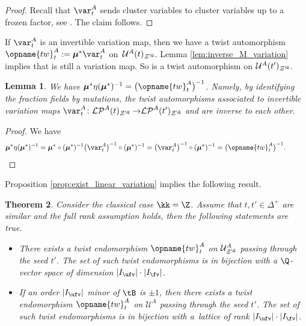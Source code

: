 \documentclass[pdftex]{sigma}
\renewcommand{\tw}{\opname{tw}}
\newcommand{\Iufv}{I_{\ufv}}
\newcommand{\Ifv}{I_{\fv}}
\newcommand{\upClAlg}{\mathcal{U}^A}
\newcommand{\LP}{{\mathcal{LP}}}
\newcommand{\fFac}{\mathcal{Z}}
\newcommand{\fFacRoot}{\fFac^{\Q}}
\newcommand{\seq}{\boldsymbol{\mu}}%
\renewcommand{\tw}{\opname{tw}}
\numberwithin{equation}{section}
\newtheorem{Theorem}{Theorem}[section]
\newtheorem{Lemma}[Theorem]{Lemma}
\begin{document}
\begin{proof}
Recall that $\var_{t}^{A}$ sends cluster variables to cluster
variables up to a frozen factor, see \cite[Lemma 4.2.2]{qin2017triangular}.
The claim follows.
\end{proof}

If $\var_{t}^{A}$ is an invertible variation map, then we have a
twist automorphism $\tw_{t}^{A}:=\seq^{*}\var_{t}^{A}$ on~$\upClAlg(t)_{\fFacRoot}$.
Lemma \ref{lem:inverse_M_variation} implies that 
is still a variation map. So \smash{$\eta:=(\seq^{*})^{-1}\bigl(\var_{t}^{A}\bigr)^{-1}$}
is a twist automorphism on $\upClAlg(t')_{\fFacRoot}$.

\begin{Lemma}\label{lem:inverse_A_twist_automorphism}
We have $\seq^{*}\eta(\seq^{*})^{-1}=\bigl(\tw_{t}^{A}\bigr)^{-1}$. Namely,
by identifying the fraction fields by mutations, the twist automorphisms
associated to invertible variation maps $\smash{\var_{t}^{A}\colon\LP^{A}(t)_{\fFacRoot}\rightarrow}\allowbreak\LP^{A}(t')_{\fFacRoot}$
and \smash{$\bigl(\var_{t}^{A}\bigr)^{-1}\colon\LP^{A}(t')_{\fFacRoot}\rightarrow\LP^{A}(t)_{\fFacRoot}$} are inverse
to each other.
\end{Lemma}

\begin{proof}
We have
\begin{align*}
\seq^{*}\eta(\seq^{*})^{-1} & =\seq^{*}\circ(\seq^{*})^{-1}\bigl(\var_{t}^{A}\bigr)^{-1}\circ(\seq^{*})^{-1} =\bigl(\var_{t}^{A}\bigr)^{-1}\circ(\seq^{*})^{-1} =\bigl(\tw_{t}^{A}\bigr)^{-1}.\tag*{\qed}
\end{align*} \renewcommand{\qed}{}
\end{proof}

Proposition \ref{prop:exist_linear_variation} implies the following
result.

\begin{Theorem}\label{thm:twist_A}
Consider the classical case $\kk=\Z$. Assume that $t,t'\in\Delta^{+}$ are similar and the full rank assumption
holds, then the following statements are true.
\begin{itemize}\itemsep=0pt
\item[$(1)$] There exists a twist endomorphism $\tw_{t}^{A}$ on $\upClAlg_{\fFacRoot}$
passing through the seed $t'$. The set of such twist endomorphisms
is in bijection with a $\Q$-vector space of dimension $|\Iufv|\cdot|\Ifv|$.
\item[$(2)$] If an order $|\Iufv|$ minor of $\tB$ is $\pm1$, then there
exists a twist endomorphism $\tw_{t}^{A}$ on $\upClAlg$ passing
through the seed $t'$. The set of such twist endomorphisms is in
bijection with a~lattice of rank $|\Iufv|\cdot|\Ifv|$.
\end{itemize}
\end{Theorem}
\end{document}
